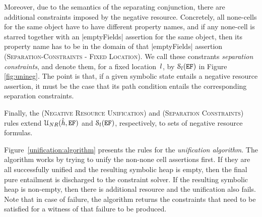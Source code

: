 Moreover, due to the semantics of the separating conjunction, there are additional  constraints imposed by the negative resource. Concretely, all none-cells for the same object have to have different property names, and if any none-cell is starred together with an \jsinline|emptyFields| assertion for the same object, then its property name has to be in the domain of that \jsinline|emptyFields| assertion (\textsc{Separation-Constraints - Fixed Location}). 
We call these constrants \emph{separation constraints}, and denote them, for a fixed location~$l$, by ${\cal S}_{l}(\mathtt{EF})$ in Figure \ref{fig:unineg}. The point is that, if a given symbolic state entails a negative resource assertion, it must be the case that its path condition entails the corresponding separation constraints.







Finally, the (\textsc{Negative Resource Unification}) and (\textsc{Separation Constraints}) rules extend ${\cal U}_{NR}(\hat{h}, \mathtt{EF})$ and ${\cal S}_{l}(\mathtt{EF})$, respectively, to sets of negative resource formulas.


Figure~\ref{unification:algorithm} presents the rules for the \emph{unification algorithm}. 
The algorithm works by trying to unify the non-none cell assertions first. If they are all 
successfully unified and the resulting symbolic heap is empty, then the final pure entailment 
is discharged to the constraint solver. If the resulting symbolic heap is non-empty, then there 
is additional resource and the unification also fails. Note that in case of failure, the algorithm 
returns the constraints that need to be satisfied for a witness of that failure to be produced. 

